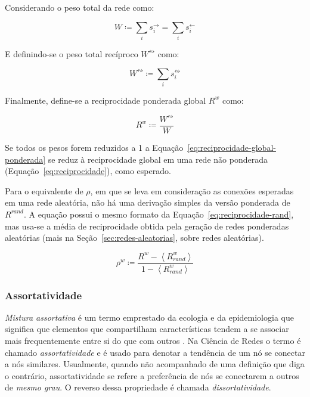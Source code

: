 \documentclass[12pt,a4paper,final]{article}
\newcommand{\avg}[1]{\left\langle #1 \right\rangle} %
\newcommand{\defn}{\coloneqq} %
\newcommand{\linkin}[1]{#1^\leftarrow} %
\newcommand{\linkout}[1]{#1^\rightarrow} %
\newcommand{\weighted}[1]{#1^w} %
\newcommand{\recboth}[1]{#1^\leftrightsquigarrow} %
\begin{document}
Considerando o peso total da rede como:

\begin{equation}
W \defn \sum_i \linkout{s}_i = \sum_i \linkin{s}_i
\end{equation}

E definindo-se o peso total recíproco $\recboth{W}$ como:

\begin{equation}
\recboth{W} \defn \sum_i \recboth{s}_i
\end{equation}

Finalmente, define-se a reciprocidade ponderada global $\weighted{R}$ como:

\begin{equation} \label{eq:reciprocidade-global-ponderada}
\weighted{R} \defn \frac{\recboth{W}}{W}
\end{equation}

Se todos os pesos forem reduzidos a 1 a Equação~\ref{eq:reciprocidade-global-ponderada} se reduz à reciprocidade global em uma rede não ponderada (Equação~\ref{eq:reciprocidade}), como esperado.

Para o equivalente de $\rho$, em que se leva em consideração as conexões esperadas em uma rede aleatória, não há uma derivação simples da versão ponderada de $R^\textit{rand}$. A equação possui o mesmo formato da Equação~\ref{eq:reciprocidade-rand}, mas usa-se a média de reciprocidade obtida pela geração de redes ponderadas aleatórias (mais na Seção~\ref{sec:redes-aleatorias}, sobre redes aleatórias).

\begin{equation}
\weighted{\rho} \defn \frac{\weighted{R} - \avg{\weighted{R}_\textit{rand}}}{1 -  \avg{\weighted{R}_\textit{rand}}}
\end{equation}

\subsubsection{Assortatividade} \label{sec:assortatividade}

\textit{Mistura assortativa} é um termo emprestado da ecologia e da epidemiologia que significa que elementos que compartilham características tendem a se associar mais frequentemente entre si do que com outros \cite{Newman2003-jn}. Na Ciência de Redes o termo é chamado \textit{assortatividade} e é usado para denotar a tendência de um nó se conectar a nós similares. Usualmente, quando não acompanhado de uma definição que diga o contrário, assortatividade se refere a preferência de nós se conectarem a outros de \textit{mesmo grau}. O reverso dessa propriedade é chamada \textit{dissortatividade}.
\end{document}

